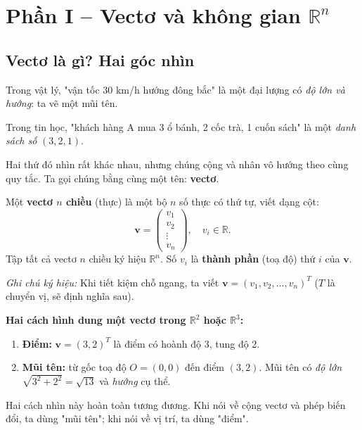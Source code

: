 \documentclass[12pt,a4paper]{article}
\begin{document}
\section{Phần I -- Vectơ và không gian $\mathbb{R}^n$}

\subsection{Vectơ là gì? Hai góc nhìn}

\begin{dongco}
Trong vật lý, "vận tốc 30 km/h hướng đông bắc" là một đại lượng có \emph{độ lớn và hướng}: ta vẽ một mũi tên.

Trong tin học, "khách hàng A mua 3 ổ bánh, 2 cốc trà, 1 cuốn sách" là một \emph{danh sách số} $(3, 2, 1)$.

Hai thứ đó nhìn rất khác nhau, nhưng chúng cộng và nhân vô hướng theo cùng quy tắc. Ta gọi chúng bằng cùng một tên: \textbf{vectơ}.
\end{dongco}

\begin{dinhnghia}
  Một \textbf{vectơ $n$ chiều} (thực) là một bộ $n$ số thực có thứ tự, viết dạng cột:
  \[
    \mathbf{v} = \begin{pmatrix} v_1 \\ v_2 \\ \vdots \\ v_n \end{pmatrix}, \quad v_i \in \mathbb{R}.
  \]
  Tập tất cả vectơ $n$ chiều ký hiệu $\mathbb{R}^n$. Số $v_i$ là \textbf{thành phần} (toạ độ) thứ $i$ của $\mathbf{v}$.

  \emph{Ghi chú ký hiệu:} Khi tiết kiệm chỗ ngang, ta viết $\mathbf{v} = (v_1, v_2, \ldots, v_n)^T$ ($T$ là chuyển vị, sẽ định nghĩa sau).
\end{dinhnghia}

\begin{ynghia}
\textbf{Hai cách hình dung một vectơ trong $\mathbb{R}^2$ hoặc $\mathbb{R}^3$:}
\begin{enumerate}
  \item \textbf{Điểm:} $\mathbf{v} = (3, 2)^T$ là điểm có hoành độ 3, tung độ 2.
  \item \textbf{Mũi tên:} từ gốc toạ độ $O = (0,0)$ đến điểm $(3,2)$. Mũi tên có \emph{độ lớn} $\sqrt{3^2 + 2^2} = \sqrt{13}$ và \emph{hướng} cụ thể.
\end{enumerate}
Hai cách nhìn này hoàn toàn tương đương. Khi nói về cộng vectơ và phép biến đổi, ta dùng "mũi tên"; khi nói về vị trí, ta dùng "điểm".
\end{ynghia}
\end{document}
